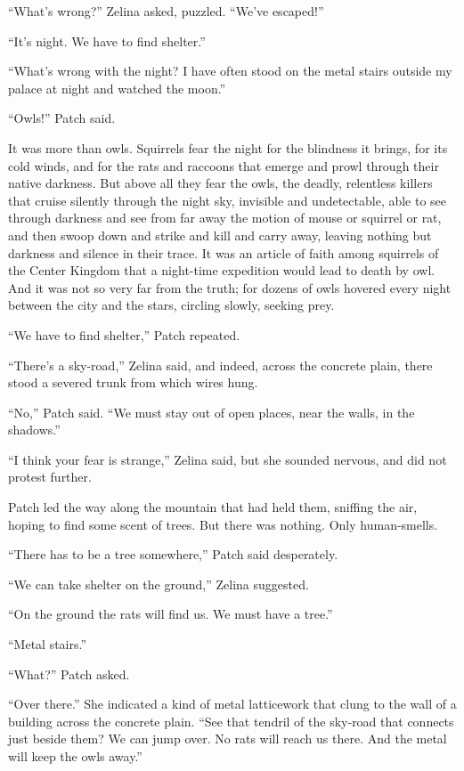 \documentclass[ebook,oneside,openany,12pt]{memoir}
\begin{document}
“What’s wrong?” Zelina asked, puzzled. “We’ve escaped!”

“It’s night. We have to find shelter.”

“What’s wrong with the night? I have often stood on the metal stairs
outside my palace at night and watched the moon.”

“Owls!” Patch said.

It was more than owls. Squirrels fear the night for the blindness it
brings, for its cold winds, and for the rats and raccoons that emerge
and prowl through their native darkness. But above all they fear the
owls, the deadly, relentless killers that cruise silently through the
night sky, invisible and undetectable, able to see through darkness
and see from far away the motion of mouse or squirrel or rat, and then
swoop down and strike and kill and carry away, leaving nothing but
darkness and silence in their trace. It was an article of faith among
squirrels of the Center Kingdom that a night-time expedition would
lead to death by owl. And it was not so very far from the truth; for
dozens of owls hovered every night between the city and the stars,
circling slowly, seeking prey.

“We have to find shelter,” Patch repeated.

“There’s a sky-road,” Zelina said, and indeed, across the concrete
plain, there stood a severed trunk from which wires hung.

“No,” Patch said. “We must stay out of open places, near the walls, in
the shadows.”

“I think your fear is strange,” Zelina said, but she sounded nervous,
and did not protest further.

Patch led the way along the mountain that had held them, sniffing the
air, hoping to find some scent of trees. But there was nothing. Only
human-smells.

“There has to be a tree somewhere,” Patch said desperately.

“We can take shelter on the ground,” Zelina suggested.

“On the ground the rats will find us. We must have a tree.”

“Metal stairs.”

“What?” Patch asked.

“Over there.” She indicated a kind of metal latticework that clung to
the wall of a building across the concrete plain. “See that tendril of
the sky-road that connects just beside them? We can jump over. No rats
will reach us there. And the metal will keep the owls away.”
\end{document}
